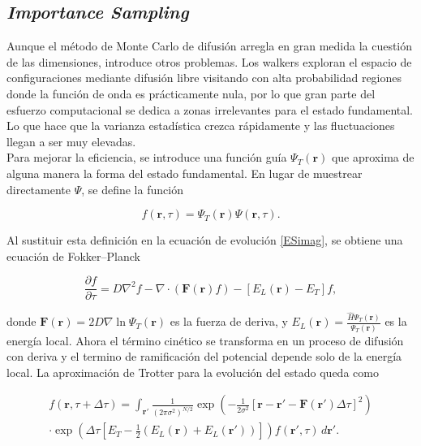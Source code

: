 \documentclass[11pt,a4paper,twoside,pdf]{article}
\numberwithin{equation}{section}
\begin{document}
\subsection{\textit{Importance Sampling}}
\label{IS}



Aunque el método de Monte Carlo de difusión arregla en gran medida la cuestión de las dimensiones, introduce otros problemas. Los walkers exploran el espacio de configuraciones mediante difusión libre visitando con alta probabilidad regiones donde la función de onda es prácticamente nula, por lo que gran parte del esfuerzo computacional se dedica a zonas irrelevantes para el estado fundamental. Lo que hace que la varianza estadística crezca rápidamente y las fluctuaciones llegan a ser muy elevadas.\\


Para mejorar la eficiencia, se introduce una función guía $\Psi_T(\mathbf r)$ que aproxima de alguna manera la forma del estado fundamental. En lugar de muestrear directamente $\Psi$, se define la función

\begin{equation}
f(\mathbf r,\tau)
=
\Psi_T(\mathbf r)\Psi(\mathbf r,\tau).
\end{equation}


Al sustituir esta definición en la ecuación de evolución \ref{ESimag}, se obtiene una ecuación de Fokker--Planck

\begin{equation}
\frac{\partial f}{\partial \tau}
=
D \nabla^2 f
-
\nabla \cdot \left( \mathbf F(\mathbf r) f \right)
-
\left[E_L(\mathbf r)-E_T\right] f,
\end{equation}

donde $\mathbf F(\mathbf r) = 2D \nabla \ln \Psi_T(\mathbf r)$ es la fuerza de deriva, y $E_L(\mathbf r) = \frac{\hat H \Psi_T(\mathbf r)}{\Psi_T(\mathbf r)}$ es la energía local. Ahora el término cinético se transforma en un proceso de difusión con deriva y el termino de ramificación del potencial depende solo de la energía local. La aproximación de Trotter para la evolución del estado queda como

\begin{equation}
\begin{split}
    f(\mathbf{r}, \tau + \Delta \tau) = \int_{\mathbf{r'}} \frac{1}{(2\pi \sigma^2)^{N/2}} \exp \left( -\frac{1}{2\sigma^2} \left[ \mathbf{r} - \mathbf{r'} -\mathbf{F}(\mathbf{r'}) \Delta \tau \right]^2 \right) \\
    \cdot \exp \left( \Delta \tau \left[ E_T - \frac{1}{2}( E_L(\mathbf{r}) + E_L(\mathbf{r'})) \right] \right) f(\mathbf{r'}, \tau) \, d\mathbf{r'}.
\end{split}
\end{equation}
\end{document}
